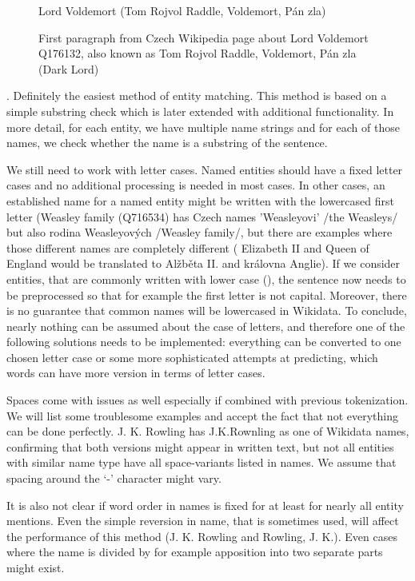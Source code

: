 \begin{figure}

Lord Voldemort (Tom Rojvol Raddle, Voldemort, Pán zla)

\caption{First paragraph from Czech Wikipedia page about Lord Voldemort Q176132, also known as Tom Rojvol Raddle, Voldemort, Pán zla (Dark Lord) }


\end{figure}

. Definitely the easiest method of entity matching. This method is based on a simple substring check which is later extended with additional functionality. In more detail, for each entity, we have multiple name strings and for each of those names, we check whether the name is a substring of the sentence.

We still need to work with letter cases. Named entities should have a fixed letter cases and no additional processing is needed in most cases. In other cases, an established name for a named entity might be written with the lowercased first letter (Weasley family (Q716534) has Czech names 'Weasleyovi' /the Weasleys/ but also rodina Weasleyových /Weasley family/, but there are examples where those different names are completely different ( Elizabeth II and Queen of England would be translated to Alžběta II. and královna Anglie). If we consider entities, that are commonly written with lower case (), the sentence now needs to be preprocessed so that for example the first letter is not capital. Moreover, there is no guarantee that common names will be lowercased in Wikidata. To conclude, nearly nothing can be assumed about the case of letters, and therefore one of the following solutions needs to be implemented: everything can be converted to one chosen letter case or some more sophisticated attempts at predicting, which words can have more version in terms of letter cases.

Spaces come with issues as well especially if combined with previous tokenization. We will list some troublesome examples and accept the fact that not everything can be done perfectly. J. K. Rowling has J.K.Rownling as one of Wikidata names, confirming that both versions might appear in written text, but not all entities with similar name type have all space-variants listed in names. We assume that spacing around the ‘-’ \todo{-} character might vary.

It is also not clear if word order in names is fixed for at least for nearly all entity mentions. Even the simple reversion in name, that is sometimes used, will affect the performance of this method (J. K. Rowling and Rowling, J. K.).  Even cases where the name is divided by for example apposition into two separate parts might exist.

